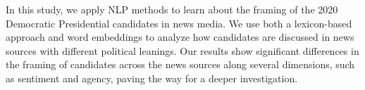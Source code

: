 In this study, we apply NLP methods to learn about the framing of the 2020 Democratic Presidential candidates in news media. We use both a lexicon-based approach and word embeddings to analyze how candidates are discussed in news sources with different political leanings.  Our results show significant differences in the framing of candidates across the news sources along several dimensions, such as sentiment and agency, paving the way for a deeper investigation.
